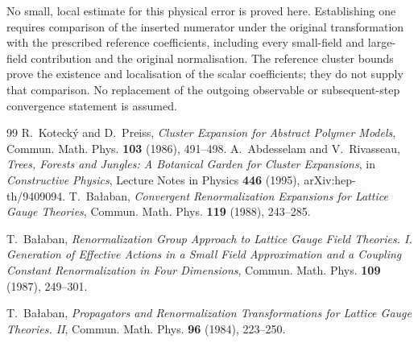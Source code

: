 \documentclass[11pt]{article}
\begin{document}
No small, local estimate for this physical error is proved here. Establishing one requires comparison of the inserted numerator under the original transformation with the prescribed reference coefficients, including every small-field and large-field contribution and the original normalisation. The reference cluster bounds prove the existence and localisation of the scalar coefficients; they do not supply that comparison. No replacement of the outgoing observable or subsequent-step convergence statement is assumed.
\begin{thebibliography}{99}
    R.~Koteck\'y and D.~Preiss,
    \emph{Cluster Expansion for Abstract Polymer Models},
    Commun. Math. Phys. \textbf{103} (1986), 491--498.
    A.~Abdesselam and V.~Rivasseau,
    \emph{Trees, Forests and Jungles: A Botanical Garden for Cluster Expansions},
    in \emph{Constructive Physics}, Lecture Notes in Physics \textbf{446} (1995),
    arXiv:hep-th/9409094.
    T.~Ba{\l}aban,
    \emph{Convergent Renormalization Expansions for Lattice Gauge Theories},
    Commun. Math. Phys. \textbf{119} (1988), 243--285.

    T.~Ba{\l}aban,
    \emph{Renormalization Group Approach to Lattice Gauge Field Theories. I. Generation of Effective Actions in a Small Field Approximation and a Coupling Constant Renormalization in Four Dimensions},
    Commun. Math. Phys. \textbf{109} (1987), 249--301.

    T.~Ba{\l}aban,
    \emph{Propagators and Renormalization Transformations for Lattice Gauge Theories. II},
    Commun. Math. Phys. \textbf{96} (1984), 223--250.

    \end{thebibliography}
\end{document}
